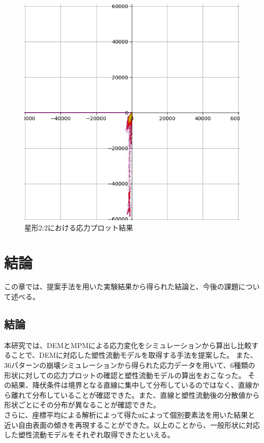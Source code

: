 \documentclass[12pt]{ltjsarticle}
\begin{document}
\begin{figure}[htbp]
  \centering
  \includegraphics*[keepaspectratio, scale=0.3]{star_outlier.PNG}
  \caption{星形2:2における応力プロット結果}
  \label{hikaku_star}
\end{figure}


\clearpage

\section{結論}
この章では、提案手法を用いた実験結果から得られた結論と、今後の課題について述べる。
\subsection{結論}
本研究では、DEMとMPMによる応力変化をシミュレーションから算出し比較することで、DEMに対応した塑性流動モデルを取得する手法を提案した。
また、36パターンの崩壊シミュレーションから得られた応力データを用いて、6種類の形状に対しての応力プロットの確認と塑性流動モデルの算出をおこなった。
その結果、降伏条件は境界となる直線に集中して分布しているのではなく、直線から離れて分布していることが確認できた。また、直線と塑性流動後の分散値から形状ごとにその分布が異なることが確認できた。\\
さらに、座標平均による解析によって得たαによって個別要素法を用いた結果と近い自由表面の傾きを再現することができた。以上のことから、一般形状に対応した塑性流動モデルをそれぞれ取得できたといえる。
\end{document}
